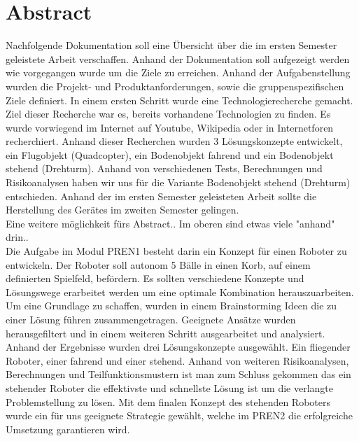 \section{Abstract}
Nachfolgende Dokumentation soll eine Übersicht über die im ersten Semester geleistete Arbeit verschaffen. Anhand der Dokumentation soll aufgezeigt werden wie vorgegangen wurde um die Ziele zu erreichen. Anhand der Aufgabenstellung wurden die Projekt- und Produktanforderungen, sowie die gruppenspezifischen Ziele definiert. In einem ersten Schritt wurde eine Technologierecherche gemacht. Ziel dieser Recherche war es, bereits vorhandene Technologien zu finden. Es wurde vorwiegend im Internet auf Youtube, Wikipedia oder in Internetforen recherchiert. Anhand dieser Recherchen wurden 3 Lösungskonzepte entwickelt, ein Flugobjekt (Quadcopter), ein Bodenobjekt fahrend und ein Bodenobjekt stehend (Drehturm). Anhand von verschiedenen Tests, Berechnungen und Risikoanalysen haben wir uns für die Variante Bodenobjekt stehend (Drehturm) entschieden. Anhand der im ersten Semester geleisteten Arbeit sollte die Herstellung des Gerätes im zweiten Semester gelingen.\\
Eine weitere möglichkeit fürs Abstract.. Im oberen sind etwas viele "{}anhand{}" drin..\\
Die Aufgabe im Modul PREN1 besteht darin ein Konzept für einen Roboter zu entwickeln. Der Roboter soll autonom 5 Bälle in einen Korb, auf einem definierten Spielfeld, befördern. Es sollten verschiedene Konzepte und Lösungswege erarbeitet werden um eine optimale Kombination herauszuarbeiten. Um eine Grundlage zu schaffen, wurden in einem Brainstorming Ideen die zu einer Lösung führen zusammengetragen. Geeignete Ansätze wurden herausgefiltert und in einem weiteren Schritt ausgearbeitet und analysiert. Anhand der Ergebnisse wurden drei Lösungskonzepte ausgewählt. Ein fliegender Roboter, einer fahrend und einer stehend. Anhand von weiteren Risikoanalysen, Berechnungen und Teilfunktionsmustern ist man zum Schluss gekommen das ein stehender Roboter die effektivste und schnellste Lösung ist um die verlangte Problemstellung zu lösen. Mit dem finalen Konzept des stehenden Roboters wurde ein für uns geeignete Strategie gewählt, welche im PREN2 die erfolgreiche Umsetzung garantieren wird.